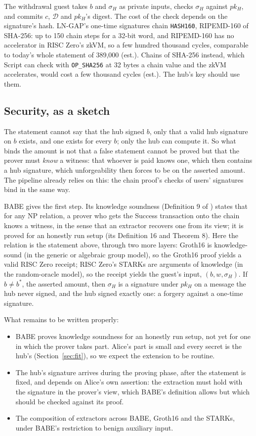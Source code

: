 \documentclass[11pt]{article}
\begin{document}
The withdrawal guest takes $b$ and $\sigma_H$ as private inputs, checks
$\sigma_H$ against $pk_H$, and commits $c$, $\mathcal{D}$ and $pk_H$'s digest. The
cost of the check depends on the signature's hash. LN-GAP's one-time
signatures chain \texttt{HASH160}, RIPEMD-160 of SHA-256: up to 150 chain
steps for a 32-bit word, and RIPEMD-160 has no accelerator in RISC
Zero's zkVM, so a few hundred thousand cycles, comparable to today's
whole statement of 389,000 (est.). Chains of SHA-256 instead, which
Script can check with \texttt{OP\_SHA256} at 32 bytes a chain value and
the zkVM accelerates, would cost a few thousand cycles (est.). The hub's
key should use them.

\subsection{Security, as a sketch}
\label{sec:security}

The statement cannot say that the hub signed $b$, only that a valid hub
signature on $b$ exists, and one exists for every $b$; only the hub can
compute it. So what binds the amount is not that a false statement
cannot be proved but that the prover must \emph{know} a witness: that
whoever is paid knows one, which then contains a hub signature, which
unforgeability then forces to be on the asserted amount. The pipeline
already relies on this: the chain proof's checks of users' signatures
bind in the same way.

BABE gives the first step. Its knowledge soundness (Definition 9 of
\cite{babe}) states that for any NP relation, a prover who gets the
Success transaction onto the chain knows a witness, in the sense that an
extractor recovers one from its view; it is proved for an honestly run
setup (its Definition 16 and Theorem 8). Here the relation is the
statement above, through two more layers: Groth16 is knowledge-sound
(in the generic or algebraic group model), so the Groth16 proof yields
a valid RISC Zero receipt; RISC Zero's STARKs are arguments of knowledge
(in the random-oracle model), so the receipt yields the guest's input,
$(b, w, \sigma_H)$. If $b \ne b^*$, the asserted amount, then $\sigma_H$
is a signature under $pk_H$ on a message the hub never signed, and the
hub signed exactly one: a forgery against a one-time signature.

What remains to be written properly:
\begin{itemize}[leftmargin=1.5em]
\item BABE proves knowledge soundness for an honestly run setup, not yet
  for one in which the prover takes part. Alice's part is small and
  every secret is the hub's (Section~\ref{sec:fit}), so we expect the
  extension to be routine.
\item The hub's signature arrives during the proving phase, after the
  statement is fixed, and depends on Alice's own assertion: the
  extraction must hold with the signature in the prover's view, which
  BABE's definition allows but which should be checked against its
  proof.
\item The composition of extractors across BABE, Groth16 and the STARKs,
  under BABE's restriction to benign auxiliary input.
\end{itemize}
\end{document}
